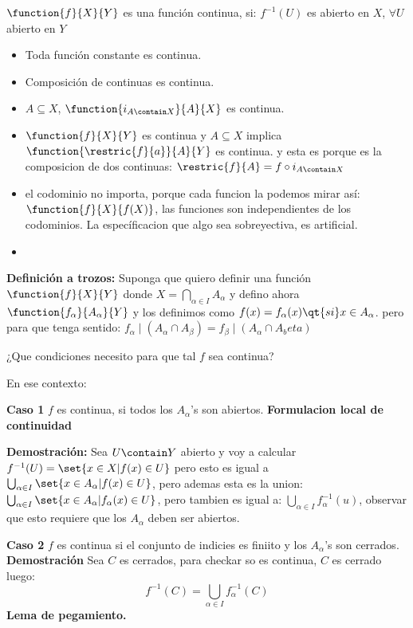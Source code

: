 \begin{define}
	$\function{f}{X}{Y}$ es una función continua, si:
	$ f^{-1}(U) $ es abierto en $X$, $\forall U$ abierto en $Y$
\end{define}
\begin{thm}
	\begin{itemize}
		\item Toda función constante es continua.
		\item Composición de continuas es continua.
		\item $A \subseteq X$, $\function{i_{A\contain X}}{A}{X}$ es continua.
		\item $\function{f}{X}{Y}$ es continua y $A \subseteq X$ implica $\function{\restric{f}{a}}{A}{Y}$ es continua. y esta es porque es la composicion de dos continuas: $ \restric{f}{A} = f \circ i_{A \contain X} $
		\item el codominio no importa, porque cada funcion la podemos mirar así: $  \function{f}{X}{f(X)} $, las funciones son independientes de los codominios. La específicacion que algo sea sobreyectiva, es artificial.
		\item 
	\end{itemize}
\end{thm}

\textbf{Definición a trozos:}
Suponga que quiero definir una función $ \function{f}{X}{Y} $ donde $X = \bigcap_{\alpha \in I} A_\alpha$ y defino ahora $\function{f_\alpha}{A_{\alpha}}{Y}$ y los definimos como $f(x) = f_\alpha (x) \qt{si} x \in A_\alpha $. pero para que tenga sentido: $ f_\alpha \mid (A_{\alpha} \cap A_{\beta}) = f_\beta \mid (A_\alpha \cap A_beta) $

¿Que condiciones necesito para que tal $f$ sea continua?

En ese contexto:

\textbf{Caso 1} $f$ es continua, si todos los $A_\alpha $'s son abiertos. \textbf{Formulacion local de continuidad}

\textbf{Demostración:} Sea $U \contain Y$ abierto y voy a calcular $ f^{-1}(U) = \set{x \in X | f(x) \in U} $ pero esto es igual  a $ \bigcup_{\alpha \in I} \set{x \in A_\alpha | f(x) \in U}$, pero ademas esta es la union: $ \bigcup_{\alpha \in I} \set{x \in A_{\alpha}| f_{\alpha}(x) \in U} $, pero tambien es igual a: $ \bigcup_{\alpha \in I}f^{-1}_\alpha (u) $, observar que esto requiere que los $A_\alpha $ deben ser abiertos.

\textbf{Caso 2}
$f$ es continua si el conjunto de indicies es finiito y los $A_\alpha $'s  son cerrados.  
\textbf{Demostración} Sea $C$ es cerrados, para checkar so es continua, $C$ es cerrado luego:
\[ f^{-1}(C) = \bigcup_{\alpha \in I } f^{-1}_\alpha(C) \]
\textbf{Lema de pegamiento.}

